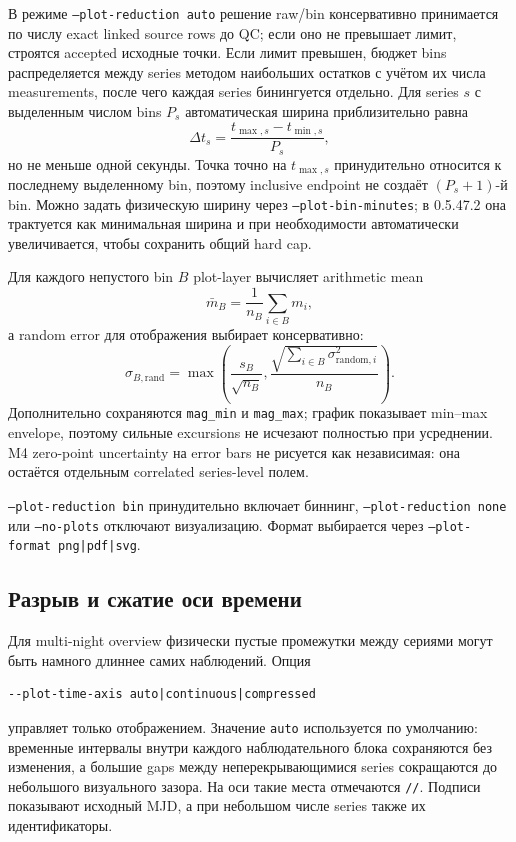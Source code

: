 В режиме \texttt{--plot-reduction auto} решение raw/bin консервативно принимается по числу exact linked source rows до QC; если оно не превышает лимит, строятся accepted исходные точки. Если лимит превышен, бюджет bins распределяется между series методом наибольших остатков с учётом их числа measurements, после чего каждая series бинингуется отдельно. Для series $s$ с выделенным числом bins $P_s$ автоматическая ширина приблизительно равна
\[
  \Delta t_s = \frac{t_{\max,s}-t_{\min,s}}{P_s},
\]
но не меньше одной секунды. Точка точно на $t_{\max,s}$ принудительно относится к последнему выделенному bin, поэтому inclusive endpoint не создаёт $(P_s+1)$-й bin. Можно задать физическую ширину через \texttt{--plot-bin-minutes}; в 0.5.47.2 она трактуется как минимальная ширина и при необходимости автоматически увеличивается, чтобы сохранить общий hard cap.

Для каждого непустого bin $B$ plot-layer вычисляет arithmetic mean
\[
  \bar m_B=\frac{1}{n_B}\sum_{i\in B}m_i,
\]
а random error для отображения выбирает консервативно:
\[
 \sigma_{B,\mathrm{rand}}=
 \max\left(
   \frac{s_B}{\sqrt{n_B}},
   \frac{\sqrt{\sum_{i\in B}\sigma_{\mathrm{random},i}^2}}{n_B}
 \right).
\]
Дополнительно сохраняются \texttt{mag\_min} и \texttt{mag\_max}; график показывает min--max envelope, поэтому сильные excursions не исчезают полностью при усреднении. M4 zero-point uncertainty на error bars не рисуется как независимая: она остаётся отдельным correlated series-level полем.

\texttt{--plot-reduction bin} принудительно включает биннинг, \texttt{--plot-reduction none} или \texttt{--no-plots} отключают визуализацию. Формат выбирается через \texttt{--plot-format png|pdf|svg}.

\subsection{Разрыв и сжатие оси времени}

Для multi-night overview физически пустые промежутки между сериями могут быть намного длиннее самих наблюдений. Опция
\begin{lstlisting}
--plot-time-axis auto|continuous|compressed
\end{lstlisting}
управляет только отображением. Значение \texttt{auto} используется по умолчанию: временные интервалы внутри каждого наблюдательного блока сохраняются без изменения, а большие gaps между неперекрывающимися series сокращаются до небольшого визуального зазора. На оси такие места отмечаются \texttt{//}. Подписи показывают исходный MJD, а при небольшом числе series также их идентификаторы.

